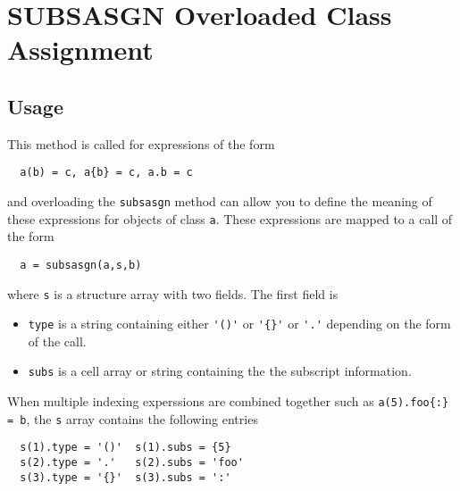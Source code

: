 \section{SUBSASGN Overloaded Class Assignment}

\subsection{Usage}

This method is called for expressions of the form
\begin{verbatim}
  a(b) = c, a{b} = c, a.b = c
\end{verbatim}
and overloading the \verb|subsasgn| method can allow you
to define the meaning of these expressions for
objects of class \verb|a|.  These expressions are mapped
to a call of the form
\begin{verbatim}
  a = subsasgn(a,s,b)
\end{verbatim}
where \verb|s| is a structure array with two fields.  The
first field is
\begin{itemize}
\item  \verb|type|  is a string containing either \verb|'()'| or
 \verb|'{}'| or \verb|'.'| depending on the form of the call.

\item  \verb|subs| is a cell array or string containing the
 the subscript information.

\end{itemize}
When multiple indexing experssions are combined together
such as \verb|a(5).foo{:} = b|, the \verb|s| array contains
the following entries
\begin{verbatim}
  s(1).type = '()'  s(1).subs = {5}
  s(2).type = '.'   s(2).subs = 'foo'
  s(3).type = '{}'  s(3).subs = ':'
\end{verbatim}
